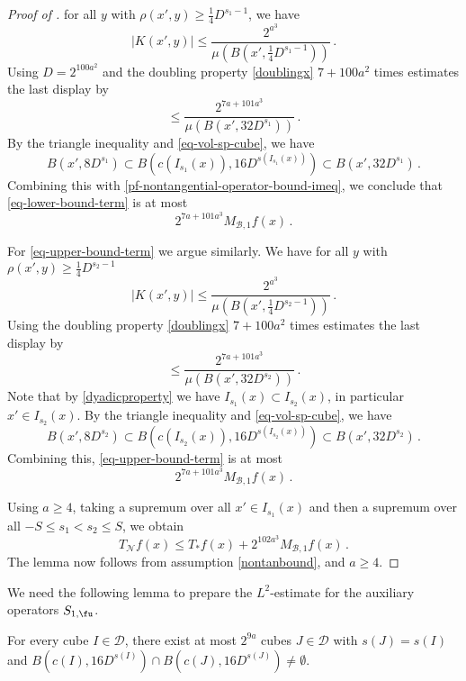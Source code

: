 \begin{proof}[Proof of ]
    for all $y$ with $\rho(x', y) \ge \frac{1}{4}D^{s_1 - 1}$, we have
    $$
        |K(x', y)| \le \frac{2^{a^3}}{\mu(B(x', \frac{1}{4}D^{s_1 - 1}))}\,.
    $$
    Using $D=2^{100a^2}$
    and the doubling property \eqref{doublingx} $7 +100a^2$ times estimates
    the last display by
    \begin{equation}
    \label{pf-nontangential-operator-bound-imeq}
        \le \frac{2^{7a+101a^3}}{\mu(B(x', 32D^{s_1}))}\, .
    \end{equation}
    By the triangle inequality and \eqref{eq-vol-sp-cube}, we have
    $$
        B(x', 8D^{s_1}) \subset B(c(I_{s_1}(x)), 16D^{s(I_{s_1}(x))}) \subset B(x', 32D^{s_1})\,.
    $$
    Combining this with \eqref{pf-nontangential-operator-bound-imeq}, we conclude that \eqref{eq-lower-bound-term} is at most
    $$
        2^{7a + 101a^3} M_{\mathcal{B},1} f(x)\,.
    $$

    For \eqref{eq-upper-bound-term} we argue similarly. We have for all $y$ with $\rho(x', y) \ge \frac{1}{4}D^{s_2-1}$
    $$
        |K(x', y)| \le \frac{2^{a^3}}{\mu(B(x', \frac{1}{4}D^{s_2-1}))}\,.
    $$
    Using the doubling property \eqref{doublingx} $7 + 100a^2$ times estimates
    the last display by
    \begin{equation}
        \le \frac{2^{7a + 101a^3}}{\mu(B(x', 32 D^{s_2}))}\, .
    \end{equation}
    Note that by \eqref{dyadicproperty} we have $I_{s_1}(x) \subset I_{s_2}(x)$, in particular $x' \in I_{s_2}(x)$.
    By the triangle inequality and \eqref{eq-vol-sp-cube}, we have
    $$
        B(x', 8D^{s_2}) \subset B(c(I_{s_2}(x)), 16D^{s(I_{s_2}(x))}) \subset B(x', 32D^{s_2})\,.
    $$
    Combining this, \eqref{eq-upper-bound-term} is at most
    $$
        2^{7a+101a^3} M_{\mathcal{B},1} f(x)\,.
    $$

    Using $a \ge 4$, taking a supremum over all $x' \in I_{s_1}(x)$ and then a supremum over all $-S \le s_1 < s_2 \le S$, we obtain
    $$
        T_{\mathcal{N}} f(x) \le T_*f(x) + 2^{102a^3} M_{\mathcal{B},1} f(x)\,.
    $$
    The lemma now follows from assumption \eqref{nontanbound},  and $a \ge 4$.
\end{proof}

We need the following lemma to prepare the $L^2$-estimate for the auxiliary operators $S_{1, \fu}$.

\begin{lemma}
    \label{boundary-overlap}
    \leanok
    For every cube $I \in \mathcal{D}$, there exist at most $2^{9a}$ cubes $J \in \mathcal{D}$ with $s(J) = s(I)$ and $B(c(I), 16D^{s(I)}) \cap B(c(J), 16 D^{s(J)}) \ne \emptyset$.
\end{lemma}

